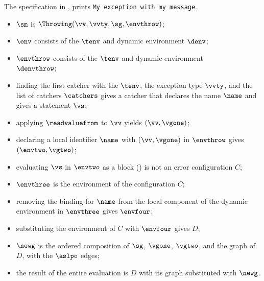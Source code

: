The specification in , prints \texttt{My exception with my message}.

\ProseParagraph
\AllApply
\begin{itemize}
  \item $\sm$ is $\Throwing(\vv, \vvty, \sg, \envthrow)$;
  \item $\env$ consists of the \staticenvironmentterm{} $\tenv$ and dynamic environment $\denv$;
  \item $\envthrow$ consists of the \staticenvironmentterm{} $\tenv$ and dynamic environment \\ $\denvthrow$;
  \item finding the first catcher with the \staticenvironmentterm{} $\tenv$, the exception type $\vvty$,
  and the list of catchers $\catchers$ gives a catcher that declares the name $\name$ and gives a statement $\vs$;
  \item applying $\readvaluefrom$ to $\vv$ yields $(\vv, \vgone)$;
  \item declaring a local identifier $\name$ with $(\vv, \vgone)$ in $\envthrow$ gives $(\envtwo, \vgtwo)$;
  \item evaluating $\vs$ in $\envtwo$ as a block () is not an error
        configuration $C$\ProseOrDynErrorDiverging;
  \item $\envthree$ is the environment of the configuration $C$;
  \item removing the binding for $\name$ from the local component of the dynamic environment in $\envthree$
        gives $\envfour$;
  \item substituting the environment of $C$ with $\envfour$ gives $D$;
  \item $\newg$ is the ordered composition of $\sg$, $\vgone$, $\vgtwo$, and the graph of $D$,
        with the $\aslpo$ edges;
  \item the result of the entire evaluation is $D$ with its graph substituted with $\newg$.
\end{itemize}
\FormallyParagraph
